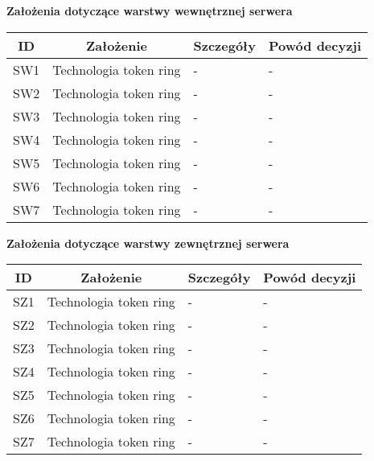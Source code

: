 \begin{center}
\par{\textbf{Założenia dotyczące warstwy wewnętrznej serwera}}
\begin{tabular}{|c|c|l|l|}
\hline
\textbf{ID} & \textbf{Założenie} & \textbf{Szczegóły} & \textbf{Powód decyzji} \\
\hline
\label{z:sw1} SW1 & Technologia token ring &  - & - \\
\hline
\label{z:sw2} SW2 & Technologia token ring &  - & - \\
\hline
\label{z:sw3} SW3 & Technologia token ring &  - & - \\
\hline
\label{z:sw4} SW4 & Technologia token ring &  - & - \\
\hline
\label{z:sw5} SW5 & Technologia token ring &  - & - \\
\hline
\label{z:sw6} SW6 & Technologia token ring &  - & - \\
\hline
\label{z:sw7} SW7 & Technologia token ring &  - & - \\
\hline

\end{tabular} 

\par{\textbf{Założenia dotyczące warstwy zewnętrznej serwera}}
\begin{tabular}{|c|c|l|l|}
\hline
\textbf{ID} & \textbf{Założenie} & \textbf{Szczegóły} & \textbf{Powód decyzji} \\
\hline
\label{z:sz1} SZ1 & Technologia token ring &  - & - \\
\hline
\label{z:sz2} SZ2 & Technologia token ring &  - & - \\
\hline
\label{z:sz3} SZ3 & Technologia token ring &  - & - \\
\hline
\label{z:sz4} SZ4 & Technologia token ring &  - & - \\
\hline
\label{z:sz5} SZ5 & Technologia token ring &  - & - \\
\hline
\label{z:sz6} SZ6 & Technologia token ring &  - & - \\
\hline
\label{z:sz7} SZ7 & Technologia token ring &  - & - \\
\hline
\end{tabular} 


\end{center}
